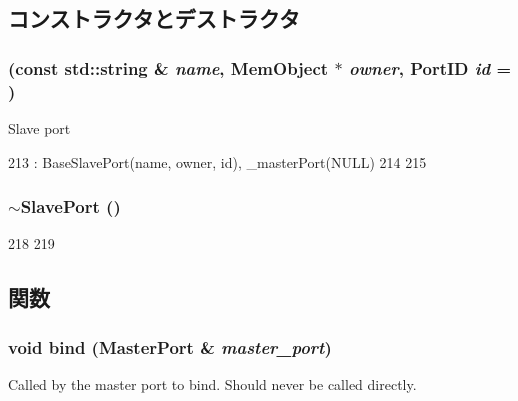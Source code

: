 \subsection{コンストラクタとデストラクタ}
\hypertarget{classSlavePort_a7f3816163b85700b0d74c0c275d030c9}{
\subsubsection[{SlavePort}]{ (const std::string \& {\em name}, \/  {\bf MemObject} $\ast$ {\em owner}, \/  {\bf PortID} {\em id} = {})}}
\label{classSlavePort_a7f3816163b85700b0d74c0c275d030c9}
Slave port 


\begin{DoxyCode}
213     : BaseSlavePort(name, owner, id), _masterPort(NULL)
214 {
215 }
\end{DoxyCode}
\hypertarget{classSlavePort_a4756d4cc1faf925dc00225c5e66c8394}{
\subsubsection[{$\sim$SlavePort}]{\setlength{\rightskip}{0pt plus 5cm}$\sim${\bf SlavePort} ()}}
\label{classSlavePort_a4756d4cc1faf925dc00225c5e66c8394}



\begin{DoxyCode}
218 {
219 }
\end{DoxyCode}


\subsection{関数}
\hypertarget{classSlavePort_ad7992aad912bd9f1bf4774673a7980e1}{
\subsubsection[{bind}]{\setlength{\rightskip}{0pt plus 5cm}void bind ({\bf MasterPort} \& {\em master\_\-port})}}
\label{classSlavePort_ad7992aad912bd9f1bf4774673a7980e1}
Called by the master port to bind. Should never be called directly. 


